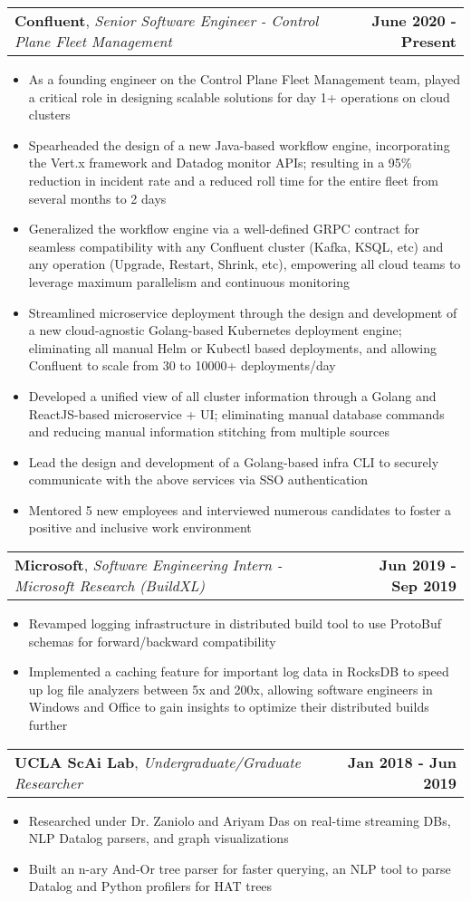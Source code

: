 \documentclass[letterpaper,10.8pt]{article}
\makeatletter
\newcommand{\resumeItemOne}[1]{
  \item[$\circ$]\small{{#1 \vspace{-2pt}}
  }
}
\newcommand{\resumeSubheading}[3]{
  \vspace{-2pt}\item[$ $]
    \begin{tabular*}{0.97\textwidth}{l@{\extracolsep{\fill}}r}
      \textbf{#1}, \textit{\small #2} & \textbf{\small #3} \\
    \end{tabular*}
  \vspace{-7pt}
}
\newcommand{\resumeItemListStart}{\begin{itemize}}
\newcommand{\resumeItemListEnd}{\end{itemize}\vspace{-5pt}}
\makeatother
\begin{document}
    \resumeSubheading
    {Confluent}{Senior Software Engineer - Control Plane Fleet Management}{June 2020 - Present}
    \resumeItemListStart
        \resumeItemOne{As a founding engineer on the Control Plane Fleet Management team, played a critical role in designing scalable solutions for day 1+ operations on cloud clusters}
        \resumeItemOne{Spearheaded the design of a new Java-based workflow engine, incorporating the Vert.x framework and Datadog monitor APIs; resulting in a 95\% reduction in incident rate and a reduced roll time for the entire fleet from several months to 2 days}
        \resumeItemOne{Generalized the workflow engine via a well-defined GRPC contract for seamless compatibility with any Confluent cluster (Kafka, KSQL, etc) and any operation (Upgrade, Restart, Shrink, etc), empowering all cloud teams to leverage maximum parallelism and continuous monitoring}
        \resumeItemOne{Streamlined microservice deployment through the design and development of a new cloud-agnostic Golang-based Kubernetes deployment engine; eliminating all manual Helm or Kubectl based deployments, and allowing Confluent to scale from 30 to 10000+ deployments/day}
        \resumeItemOne{Developed a unified view of all cluster information through a Golang and ReactJS-based microservice + UI; eliminating manual database commands and reducing manual information stitching from multiple sources}
        \resumeItemOne{Lead the design and development of a Golang-based infra CLI to securely communicate with the above services via SSO authentication}
        \resumeItemOne{Mentored 5 new employees and interviewed numerous candidates to foster a positive and inclusive work environment}
    \resumeItemListEnd

    \resumeSubheading
    {Microsoft}{Software Engineering Intern - Microsoft Research (BuildXL)}{Jun 2019 - Sep 2019}
    \resumeItemListStart
        \resumeItemOne{Revamped logging infrastructure in distributed build tool to use ProtoBuf schemas for forward/backward compatibility}
        \resumeItemOne{Implemented a caching feature for important log data in RocksDB to speed up log file analyzers between 5x and 200x, allowing software engineers in Windows and Office to gain insights to optimize their distributed builds further}
    \resumeItemListEnd
    
    \resumeSubheading
    {UCLA ScAi Lab}{Undergraduate/Graduate Researcher}{Jan 2018 - Jun 2019}
    \resumeItemListStart
        \resumeItemOne{Researched under Dr. Zaniolo and Ariyam Das on real-time streaming DBs, NLP Datalog parsers, and
        graph visualizations}
        \resumeItemOne{Built an n-ary And-Or tree parser for faster querying, an NLP tool to parse Datalog and Python profilers for HAT trees}
    \resumeItemListEnd
\end{document}

